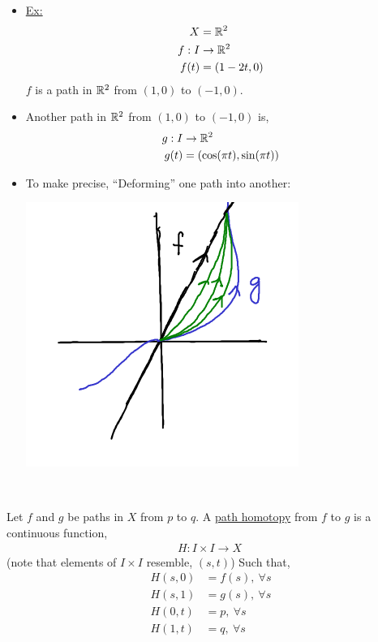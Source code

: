     \begin{itemize}
        \item \underline{Ex:}
            \begin{align*}
                X&=\mathbb{R}^2\\
                f: I &\rightarrow\mathbb{R}^2\\
                f(t)&=(1-2t,0)\\
            \end{align*}
            $f$ is a path in $\mathbb{R}^2$ from $(1,0)$ to $(-1,0)$.
        \item Another path in $\mathbb{R}^2$ from $(1,0)$ to $(-1,0)$ is,
            \begin{align*}
                g: I &\rightarrow \mathbb{R}^2\\
                g(t)&=(\cos(\pi t),\sin(\pi t))\\
            \end{align*}
        \item To make precise, ``Deforming'' one path into another:\\
            \begin{minipage}[c]{\linewidth}
                \begin{center}
                    \includegraphics[]{images/homotopy_class_2.png}
                \end{center}
            \end{minipage}\\
    \end{itemize}
        \begin{definition}
            Let $f$ and $g$ be paths in $X$ from $p$ to $q$. A \underline{path homotopy} from $f$ to $g$ is a continuous function,
            \begin{align*}
                H: I\times I \rightarrow X\
            \end{align*}
            (note that elements of $I\times I$ resemble, $(s,t)$)
            Such that,
            \begin{align*}
                H(s,0)&=f(s),\ \forall s\\
                H(s,1)&=g(s),\ \forall s\\
                H(0,t)&=p,\ \forall s\\
                H(1,t)&=q,\ \forall s\\
            \end{align*}
        \end{definition}
